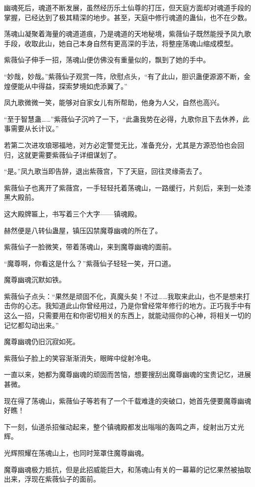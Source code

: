 \begin{this_body}
幽魂死后，魂道不断发展，虽然经历乐土仙尊的打压，但天庭方面却对魂道手段的掌握，已经达到了极其精深的地步。甚至，天庭中修行魂道的蛊仙，也不在少数。

荡魂山凝聚着海量的魂道道痕，乃是魂道的天地秘境，紫薇仙子既然能授予凤九歌手段，收取此山，她自己本身自然有更高深的手法，将整座荡魂山缩成模型。

紫薇仙子伸手一招，荡魂山便仿佛没有重量似的，飘到了她的手中。

“妙哉，妙哉。”紫薇仙子观赏一阵，欣慰点头，“有了此山，胆识蛊便源源不断，金煌便能从中得益，探索梦境如虎添翼了。”

凤九歌微微一笑，能够对自家女儿有所帮助，他身为人父，自然也高兴。

“至于智慧蛊……”紫薇仙子沉吟了一下，“此蛊我势在必得，九歌你且下去休养，此事需要从长计议。”

若第二次进攻琅琊福地，对方必定警觉无比，准备充分，尤其是方源恐怕也会回归，这就更需要紫薇仙子详细谋划了。

“是。”凤九歌当即告辞，退出紫薇宫，下了天庭，回往灵缘斋去了。

紫薇仙子也离开了紫薇宫，一手轻轻托着荡魂山，一路缓行，片刻后，来到一处漆黑大殿前。

这大殿牌匾上，书写着三个大字——镇魂殿。

赫然便是八转仙蛊屋，镇压囚禁魔尊幽魂的所在了。

紫薇仙子一脸微笑，带着荡魂山，来到魔尊幽魂的面前。

“魔尊啊，你看这是什么？”紫薇仙子轻轻一笑，开口道。

魔尊幽魂沉默如铁。

紫薇仙子点头：“果然是顽固不化，真魔头矣！不过……我取来此山，也不是想来打击你的心志。我知道此山你曾经用过，乃是你曾经常年修行的地方。正巧我手中有这么一招，只需要用在和你密切相关的东西上，就能动摇你的心神，将相关一切的记忆都勾动出来。”

魔尊幽魂仍旧沉寂如死。

紫薇仙子脸上的笑容渐渐消失，眼眸中绽射冷电。

一直以来，她都为魔尊幽魂的顽固而苦恼，想要搜刮出魔尊幽魂的宝贵记忆，进展甚微。

现在得了荡魂山，紫薇仙子等若有了一个千载难逢的突破口，她首先便要魔尊幽魂好瞧！

下一刻，仙道杀招催动起来，整个镇魂殿都发出嗡嗡的轰鸣之声，绽射出万丈光辉。

光辉照耀在荡魂山上，也同时笼罩住魔尊幽魂。

魔尊幽魂极力抵抗，但是此招威能巨大，和荡魂山有关的一幕幕的记忆果然被抽取出来，浮现在紫薇仙子的面前。


\end{this_body}
